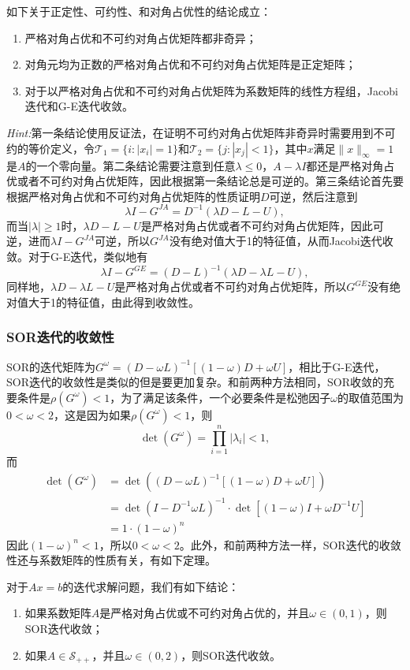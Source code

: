 \documentclass[a4paper,10pt]{ctexart}
\begin{document}
\begin{theorem}
    如下关于正定性、可约性、和对角占优性的结论成立：
    \begin{enumerate}
        \item 严格对角占优和不可约对角占优矩阵都非奇异；
        \item 对角元均为正数的严格对角占优和不可约对角占优矩阵是正定矩阵；
        \item 对于以严格对角占优和不可约对角占优矩阵为系数矩阵的线性方程组，Jacobi迭代和G-E迭代收敛。
    \end{enumerate}
\end{theorem}
\noindent \emph{Hint:}第一条结论使用反证法，在证明不可约对角占优矩阵非奇异时需要用到不可约的等价定义，令$ \mathcal{T}_1= \{i:|x_i|=1\} $和$ \mathcal{T}_2 = \{j:|x_j|<1\} $，其中$ x $满足$ \| x \|_\infty = 1 $是$ A $的一个零向量。第二条结论需要注意到任意$ \lambda\leqslant 0 $，$ A-\lambda I $都还是严格对角占优或者不可约对角占优矩阵，因此根据第一条结论总是可逆的。第三条结论首先要根据严格对角占优和不可约对角占优矩阵的性质证明$ D $可逆，然后注意到
\[
    \lambda I - G^{JA} = D^{-1}(\lambda D - L-U),
\]
而当$ |\lambda|\geqslant 1 $时，$ \lambda D - L-U $是严格对角占优或者不可约对角占优矩阵，因此可逆，进而$ \lambda I - G^{JA} $可逆，所以$ G^{JA} $没有绝对值大于1的特征值，从而Jacobi迭代收敛。对于G-E迭代，类似地有
\[
    \lambda I - G^{GE} = (D-L)^{-1}(\lambda D - \lambda L-U),
\]
同样地，$ \lambda D - \lambda L-U $是严格对角占优或者不可约对角占优矩阵，所以$ G^{GE} $没有绝对值大于1的特征值，由此得到收敛性。

\subsubsection{SOR迭代的收敛性}
SOR的迭代矩阵为$ G^{\omega} = (D-\omega L)^{-1}[(1-\omega) D + \omega U] $，相比于G-E迭代，SOR迭代的收敛性是类似的但是要更加复杂。和前两种方法相同，SOR收敛的充要条件是$ \rho(G^{\omega})<1 $，为了满足该条件，一个必要条件是松弛因子$ \omega $的取值范围为$ 0<\omega<2 $，这是因为如果$ \rho(G^{\omega})<1 $，则
\[
    \det(G^\omega) = \prod_{i=1}^n |\lambda_i| <1,
\]
而
\[
    \begin{aligned}
        \det(G^\omega) &=\det((D-\omega L)^{-1}[(1-\omega) D + \omega U])\\
        &= \det(I-D^{-1}\omega L)^{-1}\cdot \det[(1-\omega)I + \omega D^{-1} U]\\
        &= 1\cdot (1-\omega)^n
    \end{aligned}
\]
因此$ (1-\omega)^n<1 $，所以$ 0<\omega<2 $。此外，和前两种方法一样，SOR迭代的收敛性还与系数矩阵的性质有关，有如下定理。
\begin{theorem}
    对于$ Ax=b $的迭代求解问题，我们有如下结论：
    \begin{enumerate}
        \item 如果系数矩阵$ A $是严格对角占优或不可约对角占优的，并且$ \omega\in (0,1) $，则SOR迭代收敛；
        \item 如果$ A\in \mathcal{S}_{++} $，并且$ \omega\in (0,2) $，则SOR迭代收敛。
    \end{enumerate}
\end{theorem}
\end{document}
